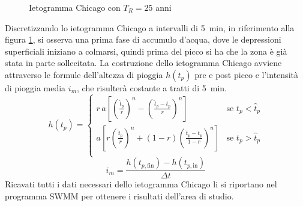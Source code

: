 \begin{figure}[htb]
    \centering
    \caption{Ietogramma Chicago con $T_R = 25$ anni}
    \label{fig:Chicago}
\end{figure}   

Discretizzando lo ietogramma Chicago a intervalli di \SI{5}{\minute}, in riferimento alla figura \ref{fig:Chicago}, si osserva una prima fase di accumulo d'acqua, dove le depressioni superficiali iniziano a colmarsi, quindi prima del picco si ha che la zona è già stata in parte sollecitata.
La costruzione dello ietogramma Chicago avviene attraverso le formule dell'altezza di pioggia $h(t_p)$ pre e post picco e l'intensità di pioggia media $i_m$, che risulterà costante a tratti di \SI{5}{\minute}.
\begin{equation}
\label{eq:altezza}
    h(t_p) = 
    \begin{cases}
        r \, a \left[ \left( \frac{\hat{t}_p}{r}\right)^n - \left( \frac{\hat{t}_p - t_p}{r}\right)^n  \right] & \text{se $t_p < \hat{t}_p$}\\
        a \left[ r \left( \frac{\hat{t}_p}{r}\right)^n + (1-r)\left( \frac{\hat{t}_p - t_p}{1 - r}\right)^n  \right] & \text{se $t_p > \hat{t}_p$}\\
    \end{cases}
\end{equation}
\begin{equation}
\label{eq:imedia}
    i_m = \frac{h(t_{p,\text{fin}}) - h(t_{p,\text{in}})}{\Delta t}
\end{equation}
Ricavati tutti i dati necessari dello ietogramma Chicago li si riportano nel programma SWMM per ottenere i risultati dell'area di studio.

